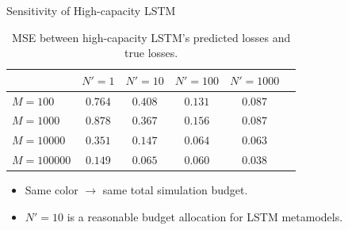 \documentclass[9pt,handout]{beamer}
\begin{document}
\begin{frame}{Sensitivity of High-capacity LSTM}

    \begin{table}[ht!]
        \centering
        \begin{tabular}{lccccc}
            \toprule
            & $N'=1$ & $N'=10$  & $N'=100$ & $N'=1000$\\
            \midrule
            $M = 100$      & \textcolor{color10_2}{$0.764$} & \textcolor{color10_3}{$0.408$} & \textcolor{color10_4}{$0.131$} & \textcolor{color10_5}{$0.087$} \\
            $M = 1000$     & \textcolor{color10_3}{$0.878$} & \textcolor{color10_4}{$0.367$} & \textcolor{color10_5}{$0.156$} & \textcolor{color10_6}{$0.087$} \\
            $M = 10000$    & \textcolor{color10_4}{$0.351$} & \textcolor{color10_5}{$0.147$} & \textcolor{color10_6}{$0.064$} & \textcolor{color10_7}{$0.063$} \\
            $M = 100000$   & \textcolor{color10_5}{$0.149$} & \textcolor{color10_6}{$0.065$} & \textcolor{color10_7}{$0.060$} & \textcolor{color10_8}{$0.038$} \\
            \bottomrule
        \end{tabular}
        \caption{MSE between high-capacity LSTM's predicted losses and true losses.}
    \end{table}

    \begin{itemize}
        \item   Same color $\rightarrow$ same total simulation budget.
        \item   $N' = 10$ is a reasonable budget allocation for LSTM metamodels.
    \end{itemize}

    
\end{frame}
\end{document}
